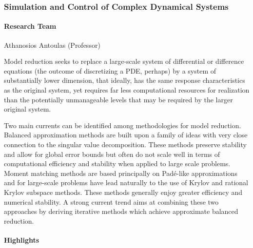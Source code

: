 
\subsubsection{Simulation and Control of Complex Dynamical Systems}\label{ict:modeling:antoulas}

\paragraph{Research Team}
Athanosios Antoulas (Professor)

Model reduction seeks to replace a large-scale system of differential
or difference equations (the outcome of discretizing a PDE, perhaps) by a
system of substantially lower dimension, that ideally, has the same
response characteristics as the original system,
yet requires far less computational resources for realization than the
potentially unmanageable levels that may be required by the larger original
system.

Two main currents can be identified among methodologies for model reduction.
Balanced approximation methods are built upon a family of
ideas with very close connection to the singular value decomposition.
These methods preserve stability and allow for global error bounds but
often do not scale well in terms of
computational efficiency and stability when applied to large scale problems.
Moment matching methods are based principally on Pad\'e-like
approximations and for large-scale problems have lead naturally to the
use of Krylov and rational Krylov subspace methods. These methods generally
enjoy greater efficiency  and numerical stability.
A strong current trend aims at combining these two approaches by deriving
iterative methods which achieve approximate balanced reduction.

\paragraph{Highlights}



